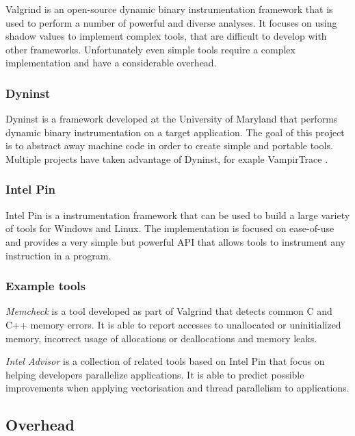 Valgrind \cite{valgrind} is an open-source dynamic binary instrumentation framework that is used to perform a number of powerful and diverse analyses. It focuses on using shadow values to implement complex tools, that are difficult to develop with other frameworks. Unfortunately even simple tools require a complex implementation and have a considerable overhead.

\subsubsection{Dyninst}

Dyninst \cite{dyninst} is a framework developed at the University of Maryland that performs dynamic binary instrumentation on a target application. The goal of this project is to abstract away machine code in order to create simple and portable tools. Multiple projects have taken advantage of Dyninst, for exaple VampirTrace \cite{vampirtrace}.

\subsubsection{Intel Pin}

Intel Pin \cite{pin} is a instrumentation framework that can be used to build a large variety of tools for Windows and Linux. The implementation is focused on ease-of-use and provides a very simple but powerful API that allows tools to instrument any instruction in a program.

\subsubsection{Example tools}

\emph{Memcheck} \cite{memcheck} is a tool developed as part of Valgrind that detects common C and C++ memory errors. It is able to report accesses to unallocated or uninitialized memory, incorrect usage of allocations or deallocations and memory leaks.

\emph{Intel Advisor} \cite{inteladvisor} is a collection of related tools based on Intel Pin that focus on helping developers parallelize applications. It is able to predict possible improvements when applying vectorisation and thread parallelism to applications.

\subsection{Overhead}

